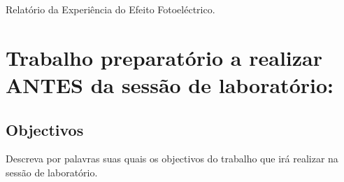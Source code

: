 \documentclass[a4paper,12pt]{article}  %
\author{Prof. Bernardo B. Carvalho}
\date{ Setembro 2015}
\newcommand{\HRule}{\rule{\linewidth}{0.5mm}}
\begin{document}
 



{  \sf \Large Relatório da Experiência do Efeito Fotoeléctrico.} %



\section{\sf Trabalho preparatório a realizar  ANTES da sessão de laboratório:}

\subsection{\sf Objectivos}
Descreva por palavras suas quais os objectivos do trabalho que irá realizar na sessão de laboratório.

\end{document}
